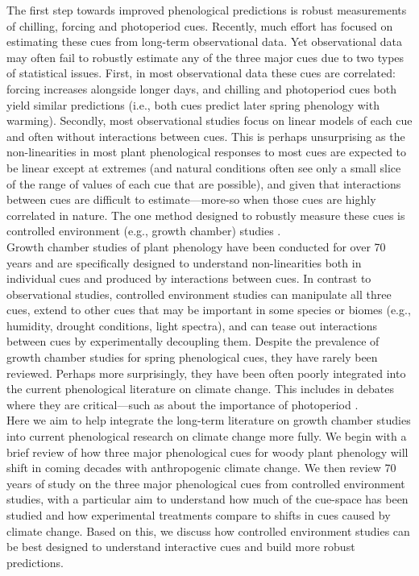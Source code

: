 \documentclass[11pt,letter]{article}
\begin{document}
The first step towards improved phenological predictions is robust measurements of chilling, forcing and photoperiod cues. Recently, much effort has focused on estimating these cues from long-term observational data. Yet observational data may often fail to robustly estimate any of the three major cues due to two types of statistical issues. First, in most observational data these cues are correlated: forcing increases alongside longer days, and chilling and photoperiod cues both yield similar predictions (i.e., both cues predict later spring phenology with warming). Secondly, most observational studies focus on linear models of each cue and often without interactions between cues. This is perhaps unsurprising as the non-linearities in most plant phenological responses to most cues are expected to be linear except at extremes (and natural conditions often see only a small slice of the range of values of each cue that are possible), and given that interactions between cues are difficult to estimate---more-so when those cues are highly correlated in nature. The one method designed to robustly measure these cues is controlled environment (e.g., growth chamber) studies \citep{nagano2012,satake2013}.\\

Growth chamber studies of plant phenology have been conducted for over 70 years and are specifically designed to understand non-linearities both in individual cues and produced by interactions between cues. In contrast to observational studies, controlled environment studies can manipulate all three cues, extend to other cues that may be important in some species or biomes (e.g., humidity, drought conditions, light spectra), and can tease out interactions between cues by experimentally decoupling them. Despite the prevalence of growth chamber studies for spring phenological cues, they have rarely been reviewed. Perhaps more surprisingly, they have been often poorly integrated into the current phenological literature on climate change. This includes in debates where they are critical---such as about the importance of photoperiod \citep[e.g.,]{fu2015,richspurce2018}.\\

Here we aim to help integrate the long-term literature on growth chamber studies into current phenological research on climate change more fully. We begin with a brief review of how three major phenological cues for woody plant phenology will shift in coming decades with anthropogenic climate change. We then review 70 years of study on the three major phenological cues from controlled environment studies, with a particular aim to understand how much of the cue-space has been studied and how experimental treatments compare to shifts in cues caused by climate change. Based on this, we discuss how controlled environment studies can be best designed to understand interactive cues and build more robust predictions.\\ %
\end{document}
